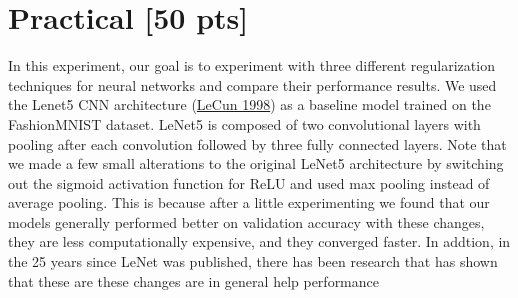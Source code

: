 \documentclass{article}
\begin{document}
\section{Practical [50 pts]}

In this experiment, our goal is to experiment with three different regularization techniques for neural networks and compare their performance results. We used the Lenet5 CNN architecture (\href{http://vision.stanford.edu/cs598_spring07/papers/Lecun98.pdf}{LeCun 1998}) as a baseline model trained on the FashionMNIST dataset. LeNet5 is composed of two convolutional layers with pooling after each convolution followed by three fully connected layers. Note that we made a few small alterations to the original LeNet5 architecture by switching out the sigmoid activation function for ReLU and used max pooling instead of average pooling. This is because after a little experimenting we found that our models generally performed better on validation accuracy with these changes, they are less computationally expensive, and they converged faster. In addtion, in the 25 years since LeNet was published, there has been research that has shown that these are these changes are in general help performance
\end{document}
